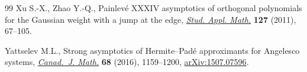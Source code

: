 \documentclass[pdftex]{sigma}
\numberwithin{equation}{section}
\begin{document}
\begin{thebibliography}{99}
Xu S.-X., Zhao Y.-Q., Painlev\'e {XXXIV} asymptotics of orthogonal polynomials
 for the {G}aussian weight with a jump at the edge,
 \href{https://doi.org/10.1111/j.1467-9590.2010.00512.x}{\textit{Stud. Appl.
 Math.}} \textbf{127} (2011), 67--105.

Yattselev M.L., Strong asymptotics of {H}ermite--{P}ad\'e approximants for
 {A}ngelesco systems,
 \href{https://doi.org/10.4153/CJM-2015-043-3}{\textit{Canad.~J. Math.}}
 \textbf{68} (2016), 1159--1200, \href{http://arxiv.org/abs/1507.07596}{arXiv:1507.07596}.

\end{thebibliography}\LastPageEnding
\end{document}
